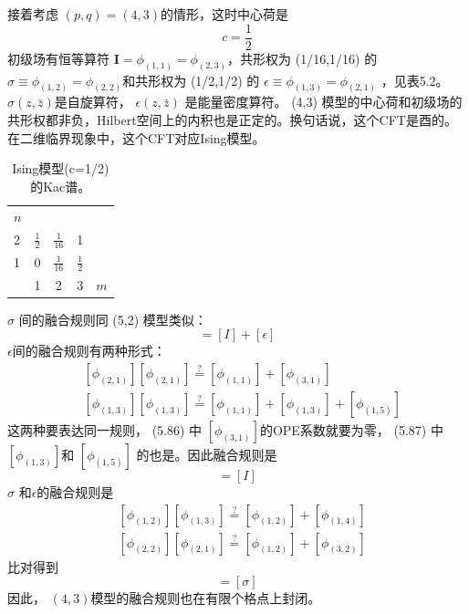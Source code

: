 接着考虑 $(p,q)=(4,3) $的情形，这时中心荷是
$$
c=\frac{1}{2}
$$
初级场有恒等算符 $\boldsymbol{I}=\phi_{(1,1)}=\phi_{(2,3)} $，共形权为 (1/16,1/16) 的 $\sigma \equiv \phi_{(1,2)}=\phi_{(2,2)} $和共形权为 (1/2,1/2) 的 $\epsilon \equiv \phi_{(1,3)}=\phi_{(2,1)}$ ，见表5.2。 $\sigma(z, \bar{z}) $是自旋算符， $\epsilon(z, \bar{z})$ 是能量密度算符。 (4,3) 模型的中心荷和初级场的共形权都非负，Hilbert空间上的内积也是正定的。换句话说，这个CFT是酉的。在二维临界现象中，这个CFT对应Ising模型。
\begin{table}[h]
	\centering
		\begin{tabular}{l|cccc}
			$n$ &               &                &               &     \\
			2   & $\frac{1}{2}$ & $\frac{1}{16}$ & 1             &     \\
			1   & 0             & $\frac{1}{16}$ & $\frac{1}{2}$ &     \\ \hline
			& 1             & 2              & 3             & $m$
		\end{tabular}
	\caption{Ising模型(c=1/2)的Kac谱。}
\end{table}

$\sigma$ 间的融合规则同 (5,2) 模型类似：
\begin{equation}
	[\sigma][\sigma]=[I]+[\epsilon]
\end{equation}
$\epsilon $间的融合规则有两种形式：
\begin{align} &{\left[\phi_{(2,1)}\right]\left[\phi_{(2,1)}\right] \stackrel{?}{=}\left[\phi_{(1,1)}\right]+\left[\phi_{(3,1)}\right]}\\& {\left[\phi_{(1,3)}\right]\left[\phi_{(1,3)}\right] \stackrel{?}{=}\left[\phi_{(1,1)}\right]+\left[\phi_{(1,3)}\right]+\left[\phi_{(1,5)}\right] } \end{align}
这两种要表达同一规则， (5.86) 中 $\left[\phi_{(3,1)}\right] $的OPE系数就要为零， (5.87) 中 $\left[\phi_{(1,3)}\right] $和 $\left[\phi_{(1,5)}\right]$ 的也是。因此融合规则是
\begin{equation}
	[\epsilon][\epsilon]=[I]
\end{equation}
$\sigma$ 和$ \epsilon $的融合规则是
\begin{align} &\left[\phi_{(1,2)}\right]\left[\phi_{(1,3)}\right] \stackrel{?}{=}\left[\phi_{(1,2)}\right]+\left[\phi_{(1,4)}\right]\\& \left[\phi_{(2,2)}\right]\left[\phi_{(2,1)}\right] \stackrel{?}{=}\left[\phi_{(1,2)}\right]+\left[\phi_{(3,2)}\right] \end{align}
比对得到
\begin{equation}
	[\sigma][\epsilon]=[\sigma]
\end{equation}
因此， $(4,3) $模型的融合规则也在有限个格点上封闭。

